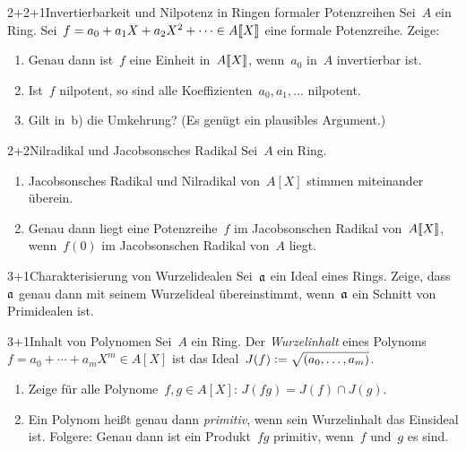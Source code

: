 \documentclass{uebblatt}
\begin{document}

\begin{aufgabe}{2+2+1}{Invertierbarkeit und Nilpotenz in Ringen formaler Potenzreihen}
Sei~$A$ ein Ring. Sei~$f = a_0 + a_1 X + a_2 X^2 + \cdots \in
{A}\llbracket{X}\rrbracket$ eine formale Potenzreihe. Zeige:
\begin{enumerate}
\item Genau dann ist~$f$ eine Einheit in~${A}\llbracket{X}\rrbracket$, wenn~$a_0$ in~$A$ invertierbar
ist.
\item Ist~$f$ nilpotent, so sind alle Koeffizienten~$a_0,a_1,\ldots$ nilpotent.
\item Gilt in~b) die Umkehrung? (Es genügt ein plausibles Argument.)
\end{enumerate}
\end{aufgabe}

\begin{aufgabe}{2+2}{Nilradikal und Jacobsonsches Radikal}
Sei~$A$ ein Ring.
\begin{enumerate}
\item Jacobsonsches Radikal und Nilradikal von~$A[X]$ stimmen miteinander überein.
\item Genau dann liegt eine Potenzreihe~$f$ im Jacobsonschen Radikal
von~${A}\llbracket{X}\rrbracket$, wenn~$f(0)$ im Jacobsonschen Radikal von~$A$ liegt.
\end{enumerate}
\end{aufgabe}

\begin{aufgabe}{3+1}{Charakterisierung von Wurzelidealen}
Sei~$\mathfrak{a}$ ein Ideal eines Rings. Zeige, dass~$\mathfrak{a}$ genau dann mit
seinem Wurzelideal übereinstimmt, wenn~$\mathfrak{a}$ ein Schnitt von Primidealen ist.
\end{aufgabe}

\begin{aufgabe}{3+1}{Inhalt von Polynomen}
Sei~$A$ ein Ring. Der \emph{Wurzelinhalt} eines Polynoms~$f = a_0 + \cdots +
a_m X^m \in A[X]$ ist das Ideal~$J(f) \vcentcolon= \sqrt{(a_0,\ldots,a_m)}$.
\begin{enumerate}
\item Zeige für alle Polynome~$f, g \in A[X]$: $J(fg) = J(f) \cap J(g)$.
\item Ein Polynom heißt genau dann \emph{primitiv}, wenn sein Wurzelinhalt das
Einsideal ist. Folgere: Genau dann ist ein Produkt~$fg$ primitiv, wenn~$f$
und~$g$ es sind.
\end{enumerate}
\end{aufgabe}
\end{document}
